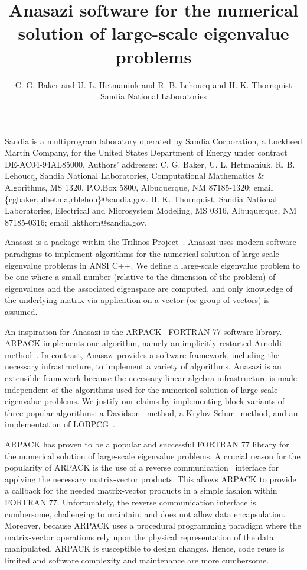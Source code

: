 \documentclass[acmtoms]{acmtrans2m}
\title{Anasazi software for the numerical solution of large-scale eigenvalue problems}
\author{C. G. Baker and
U. L. Hetmaniuk and R. B. Lehoucq and H. K. Thornquist\\ Sandia
National Laboratories}
\newcounter{algorithm}
\begin{document}
\begin{bottomstuff}
Sandia is a multiprogram laboratory operated by Sandia Corporation,
a Lockheed Martin Company, for the United States Department of
Energy under contract DE-AC04-94AL85000. Authors' addresses: C. G.
Baker, U. L. Hetmaniuk, R. B. Lehoucq,
Sandia National Laboratories, Computational Mathematics \&
Algorithms, MS 1320, P.O.Box 5800, Albuquerque, NM 87185-1320; email
\{cgbaker,ulhetma,rblehou\}@sandia.gov. H. K. Thornquist, Sandia National
Laboratories, Electrical and Microsystem Modeling, MS 0316,
Albuquerque, NM 87185-0316; email hkthorn@sandia.gov.

\end{bottomstuff}

\maketitle

Anasazi is a package within the Trilinos
Project~\cite{Heroux:2005:OTP}. Anasazi uses modern software
paradigms to implement algorithms for the numerical solution of
large-scale eigenvalue problems in ANSI C++. We define a
large-scale eigenvalue problem to be one where a small number
(relative to the dimension of the problem) of eigenvalues and the
associated eigenspace are computed, and only knowledge of the
underlying matrix via application on a vector (or group of vectors)
is assumed.

An inspiration for Anasazi is the ARPACK~\cite{lesy:98} FORTRAN 77
software library. ARPACK implements one algorithm, namely an
implicitly restarted Arnoldi method~\cite{sore:92}. In contrast,
Anasazi provides a software framework, including the necessary
infrastructure, to implement a variety of algorithms.  Anasazi is an
extensible framework because the necessary linear algebra
infrastructure is made independent of the algorithms used for the
numerical solution of large-scale eigenvalue problems. We justify
our claims by implementing block variants of three popular
algorithms: a Davidson~\cite{davi:75} method, a
Krylov-Schur~\cite{stew:01} method, and an implementation of
LOBPCG~\cite{knya:01}.

ARPACK has proven to be a popular and successful FORTRAN 77 library
for the numerical solution of large-scale eigenvalue problems. A
crucial reason for the popularity of ARPACK is the use of a reverse
communication~\cite[p.~3]{lesy:98} interface for applying the
necessary matrix-vector products. This allows ARPACK to provide a
callback for the needed matrix-vector products in a simple fashion
within FORTRAN 77. Unfortunately, the reverse communication
interface is cumbersome, challenging to maintain, and does not allow
data encapsulation. Moreover, because ARPACK uses a procedural
programming paradigm where the matrix-vector operations rely upon
the physical representation of the data manipulated, ARPACK is
susceptible to design changes. Hence, code reuse is limited and
software complexity and maintenance are more cumbersome.
\end{document}
